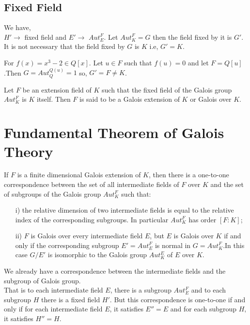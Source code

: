 \subsection{Fixed Field}
We have,\\
\(H' \rightarrow\) fixed field and \(E' \rightarrow\) \(Aut_E^F\).\hspace{5mm} Let \(Aut_K^F = G\) then the field fixed by it is \(G'\). It is not necessary that the field fixed by \(G\) is \(K\) i.e, \(G'=K\).
\begin{example}
  For \(f(x)=x^3-2 \in Q[x]\). Let \(u \in F\) such that \(f(u)=0\) and let \(F=Q[u]\).Then
  \(G=Aut_Q^{Q(u)}={1}\) so, \hspace{5mm}\(G'=F \neq K\).
\end{example}

\begin{definition}
  Let \(F\) be an extension field of \(K\) such that the fixed field of the Galois group \(Aut_K^F\) is \(K\) itself. Then \(F\) is said to be a Galois extension of \(K\) or Galois over \( K\).
\end{definition}

\section{Fundamental Theorem of Galois Theory}
\begin{theorem}
  If \(F\) is a finite dimensional Galois extension of \(K\), then there is a one-to-one correspondence between the set of all intermediate fields of \(F\) over \(K\) and the set of subgroups of the Galois group \(Aut_K^F\) such that:
  \begin{enumerate}
  \item[i)] the relative dimension of two intermediate fields is equal to the relative index of the corresponding subgroups. In particular \(Aut_K^F\) has order \([F:K]\);
  \item[ii)] \(F\) is Galois over every intermediate field \(E\), but \(E\) is Galois over \(K\) if and only if the corresponding subgroup \(E'= Aut_E^F\) is normal in \(G=Aut_K^F\).In this case \(G/E'\) is isomorphic to the Galois group \(Aut_K^E\) of \(E\) over \(K\).
  \end{enumerate}
\end{theorem}
We already have a correspondence between the intermediate fields and the subgroup of Galois group.\\
That is to each intermediate field \(E\), there is a subgroup \(Aut_E^F\) and to each subgroup \(H\) there is a fixed field \(H'\). But this correspondence is one-to-one if and only if for each intermediate field \(E\), it satisfies \(E''=E\) and for each subgroup \(H\), it satisfies \(H''=H\).

